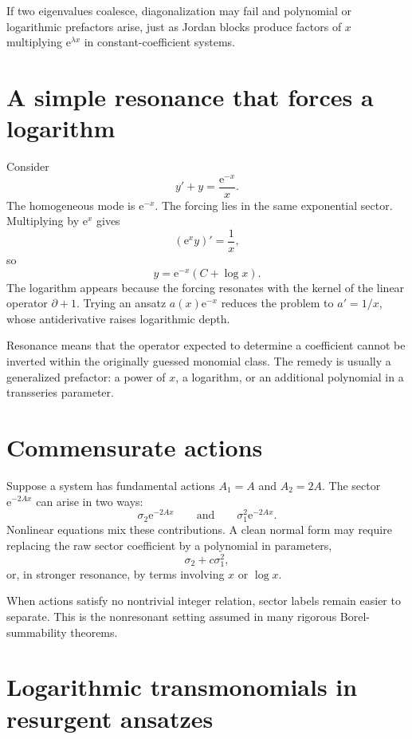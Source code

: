 \documentclass[11pt,openany]{book}
\theoremstyle{definition}
\theoremstyle{plain}
\theoremstyle{remark}
\newcommand{\e}{\mathrm{e}}
\begin{document}
If two eigenvalues coalesce, diagonalization may fail and polynomial or logarithmic prefactors arise, just as Jordan blocks produce factors of $x$ multiplying $\e^{\lambda x}$ in constant-coefficient systems.

\section{A simple resonance that forces a logarithm}

Consider
\begin{equation}\label{eq:log-resonance}
 y'+y=\frac{\e^{-x}}x.
\end{equation}
The homogeneous mode is $\e^{-x}$. The forcing lies in the same exponential sector. Multiplying by $\e^x$ gives
\[
 (\e^xy)'=\frac1x,
\]
so
\begin{equation}\label{eq:log-resonance-solution}
 y=\e^{-x}(C+\log x).
\end{equation}
The logarithm appears because the forcing resonates with the kernel of the linear operator $\partial+1$. Trying an ansatz $a(x)\e^{-x}$ reduces the problem to $a'=1/x$, whose antiderivative raises logarithmic depth.

\begin{intuitionbox}
Resonance means that the operator expected to determine a coefficient cannot be inverted within the originally guessed monomial class. The remedy is usually a generalized prefactor: a power of $x$, a logarithm, or an additional polynomial in a transseries parameter.
\end{intuitionbox}

\section{Commensurate actions}

Suppose a system has fundamental actions $A_1=A$ and $A_2=2A$. The sector $\e^{-2Ax}$ can arise in two ways:
\[
 \sigma_2\e^{-2Ax}
 \qquad\text{and}\qquad
 \sigma_1^2\e^{-2Ax}.
\]
Nonlinear equations mix these contributions. A clean normal form may require replacing the raw sector coefficient by a polynomial in parameters,
\[
 \sigma_2+c\sigma_1^2,
\]
or, in stronger resonance, by terms involving $x$ or $\log x$.

When actions satisfy no nontrivial integer relation, sector labels remain easier to separate. This is the nonresonant setting assumed in many rigorous Borel-summability theorems.

\section{Logarithmic transmonomials in resurgent ansatzes}
\end{document}
